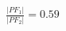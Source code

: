 \documentclass[preview]{standalone}
\begin{document}
\begin{align*}
\frac{|PF_1|}{|PF_2|} = 0.59
\end{align*}
\end{document}
